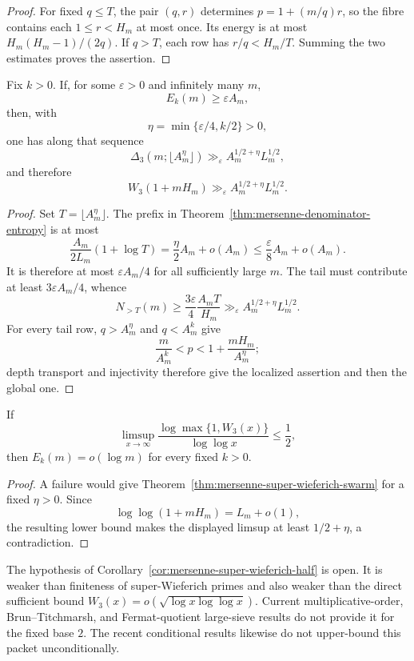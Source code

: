 \begin{proof}
For fixed $q\le T$, the pair $(q,r)$ determines
$p=1+(m/q)r$, so the fibre contains each $1\le r<H_m$ at most once.  Its
energy is at most $H_m(H_m-1)/(2q)$.  If $q>T$, each row has
$r/q<H_m/T$.  Summing the two estimates proves the assertion.
\end{proof}

\begin{theorem}
\label{thm:mersenne-super-wieferich-swarm}
Fix $k>0$.  If, for some $\varepsilon>0$ and infinitely many $m$,
\[
 E_k(m)\ge\varepsilon A_m,
\]
then, with
\[
 \eta=\min\{\varepsilon/4,k/2\}>0,
\]
one has along that sequence
\[
 \Delta_3(m;\lfloor A_m^\eta\rfloor)
 \gg_\varepsilon A_m^{1/2+\eta}L_m^{1/2},
\]
and therefore
\[
 W_3(1+mH_m)\gg_\varepsilon
 A_m^{1/2+\eta}L_m^{1/2}.
\]
\end{theorem}

\begin{proof}
Set $T=\lfloor A_m^\eta\rfloor$.  The prefix in
Theorem~\ref{thm:mersenne-denominator-entropy} is at most
\[
 \frac{A_m}{2L_m}(1+\log T)
 =\frac\eta2A_m+o(A_m)
 \le\frac\varepsilon8A_m+o(A_m).
\]
It is therefore at most $\varepsilon A_m/4$ for all sufficiently large
$m$.  The tail must contribute at least $3\varepsilon A_m/4$, whence
\[
 N_{>T}(m)\ge\frac{3\varepsilon}{4}\frac{A_mT}{H_m}
 \gg_\varepsilon A_m^{1/2+\eta}L_m^{1/2}.
\]
For every tail row, $q>A_m^\eta$ and $q<A_m^k$ give
\[
 \frac m{A_m^k}<p<1+\frac{mH_m}{A_m^\eta};
\]
depth transport and injectivity therefore give the localized assertion and
then the global one.
\end{proof}

\begin{corollary}
\label{cor:mersenne-super-wieferich-half}
If
\[
 \limsup_{x\to\infty}
 \frac{\log\max\{1,W_3(x)\}}{\log\log x}\le\frac12,
\]
then $E_k(m)=o(\log m)$ for every fixed $k>0$.
\end{corollary}

\begin{proof}
A failure would give Theorem~\ref{thm:mersenne-super-wieferich-swarm}
for a fixed $\eta>0$.  Since
\[
 \log\log(1+mH_m)=L_m+o(1),
\]
the resulting lower bound makes the displayed limsup at least
$1/2+\eta$, a contradiction.
\end{proof}

The hypothesis of Corollary~\ref{cor:mersenne-super-wieferich-half} is open.
It is weaker than finiteness of super-Wieferich primes and also weaker than
the direct sufficient bound
$W_3(x)=o(\sqrt{\log x\log\log x})$.  Current multiplicative-order,
Brun--Titchmarsh, and Fermat-quotient large-sieve results
\cite{ErdosMurty1999,MurtySeguin2019,Yamada2010,ShparlinskiFermatQuotients2011}
do not provide it for the fixed base $2$.  The recent conditional results
\cite{FelliniMurty2026,LiZhao2026} likewise do not upper-bound this packet
unconditionally.


